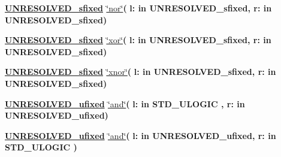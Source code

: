 \begin{DoxyCompactItemize}
\item 
{\bfseries {\bfseries {\bfseries \hyperlink{classfixed__pkg_aa723b28a027c3c0f9bca02d75e8df4d6}{U\+N\+R\+E\+S\+O\+L\+V\+E\+D\+\_\+sfixed}} \textcolor{vhdlchar}{ }}} \hyperlink{classfixed__pkg_aba94b3a197c86730cc9f6a781627f5fe}{\char`\"{}nor\char`\"{}}{\bfseries  ( }{\bfseries \textcolor{vhdlchar}{l\+: }\textcolor{stringliteral}{in }\textcolor{vhdlchar}{U\+N\+R\+E\+S\+O\+L\+V\+E\+D\+\_\+sfixed}}{\bfseries  , \textcolor{vhdlchar}{r\+: }\textcolor{stringliteral}{in }\textcolor{vhdlchar}{U\+N\+R\+E\+S\+O\+L\+V\+E\+D\+\_\+sfixed}}{\bfseries  )} 
\item 
{\bfseries {\bfseries {\bfseries \hyperlink{classfixed__pkg_aa723b28a027c3c0f9bca02d75e8df4d6}{U\+N\+R\+E\+S\+O\+L\+V\+E\+D\+\_\+sfixed}} \textcolor{vhdlchar}{ }}} \hyperlink{classfixed__pkg_a9d79642f1fcfe0389cc598750a41b001}{\char`\"{}xor\char`\"{}}{\bfseries  ( }{\bfseries \textcolor{vhdlchar}{l\+: }\textcolor{stringliteral}{in }\textcolor{vhdlchar}{U\+N\+R\+E\+S\+O\+L\+V\+E\+D\+\_\+sfixed}}{\bfseries  , \textcolor{vhdlchar}{r\+: }\textcolor{stringliteral}{in }\textcolor{vhdlchar}{U\+N\+R\+E\+S\+O\+L\+V\+E\+D\+\_\+sfixed}}{\bfseries  )} 
\item 
{\bfseries {\bfseries {\bfseries \hyperlink{classfixed__pkg_aa723b28a027c3c0f9bca02d75e8df4d6}{U\+N\+R\+E\+S\+O\+L\+V\+E\+D\+\_\+sfixed}} \textcolor{vhdlchar}{ }}} \hyperlink{classfixed__pkg_ac43011f4d5e7b4f487025cd4a9801b9f}{\char`\"{}xnor\char`\"{}}{\bfseries  ( }{\bfseries \textcolor{vhdlchar}{l\+: }\textcolor{stringliteral}{in }\textcolor{vhdlchar}{U\+N\+R\+E\+S\+O\+L\+V\+E\+D\+\_\+sfixed}}{\bfseries  , \textcolor{vhdlchar}{r\+: }\textcolor{stringliteral}{in }\textcolor{vhdlchar}{U\+N\+R\+E\+S\+O\+L\+V\+E\+D\+\_\+sfixed}}{\bfseries  )} 
\item 
{\bfseries {\bfseries {\bfseries \hyperlink{classfixed__pkg_ae78bc2b36d22f6abeac163955e8a587d}{U\+N\+R\+E\+S\+O\+L\+V\+E\+D\+\_\+ufixed}} \textcolor{vhdlchar}{ }}} \hyperlink{classfixed__pkg_a4b8a7afcf0a5903776e4c8b8337ba236}{\char`\"{}and\char`\"{}}{\bfseries  ( }{\bfseries \textcolor{vhdlchar}{l\+: }\textcolor{stringliteral}{in }{\bfseries \textcolor{comment}{S\+T\+D\+\_\+\+U\+L\+O\+G\+I\+C}\textcolor{vhdlchar}{ }}}{\bfseries  , \textcolor{vhdlchar}{r\+: }\textcolor{stringliteral}{in }\textcolor{vhdlchar}{U\+N\+R\+E\+S\+O\+L\+V\+E\+D\+\_\+ufixed}}{\bfseries  )} 
\item 
{\bfseries {\bfseries {\bfseries \hyperlink{classfixed__pkg_ae78bc2b36d22f6abeac163955e8a587d}{U\+N\+R\+E\+S\+O\+L\+V\+E\+D\+\_\+ufixed}} \textcolor{vhdlchar}{ }}} \hyperlink{classfixed__pkg_a4b8a7afcf0a5903776e4c8b8337ba236}{\char`\"{}and\char`\"{}}{\bfseries  ( }{\bfseries \textcolor{vhdlchar}{l\+: }\textcolor{stringliteral}{in }\textcolor{vhdlchar}{U\+N\+R\+E\+S\+O\+L\+V\+E\+D\+\_\+ufixed}}{\bfseries  , \textcolor{vhdlchar}{r\+: }\textcolor{stringliteral}{in }{\bfseries \textcolor{comment}{S\+T\+D\+\_\+\+U\+L\+O\+G\+I\+C}\textcolor{vhdlchar}{ }}}{\bfseries  )} 

\end{DoxyCompactItemize}
